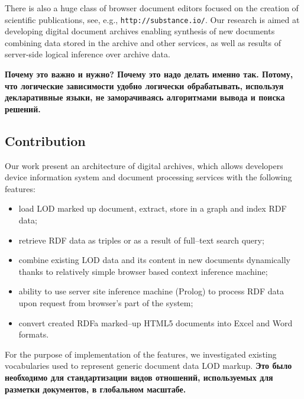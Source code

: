 \documentclass[conference,a4paper]{IEEEtran}
\providecommand\url[1]{\texttt{#1}}
\begin{document}
There is also a huge class of browser document editors focused on the creation of scientific publications, see, e.g., \url{http://substance.io/}.  %
Our research is aimed at developing digital document archives enabling
synthesis of new documents combining data stored in the archive and other
services, as well as results of server-side logical inference over archive data.

\textbf{Почему это важно и нужно? Почему это надо делать именно так. Потому, что логические зависимости удобно логически обрабатывать, используя декларативные языки, не заморачиваясь алгоритмами вывода и поиска решений.}

\subsection{Contribution}
\label{sec:contr}

Our work present an architecture of digital archives, which allows
developers device information system and document processing services
with the following features:
\begin{itemize}
\item load LOD marked up document, extract, store in a graph and index RDF data;
\item retrieve RDF data as triples or as a result of full--text search query;
\item combine existing LOD data and its content in new documents dynamically
  thanks to relatively simple browser based context inference machine;
\item ability to use server site inference machine (Prolog) to process RDF data upon
  request from browser's part of the system;
\item convert created RDFa marked--up HTML5 documents into Excel and Word formats.
\end{itemize}

For the purpose of implementation of the features, we investigated existing
vocabularies used to represent generic document data LOD markup.  \textbf{Это было необходимо для стандартизации видов отношений, используемых для разметки документов, в глобальном масштабе.}
\end{document}
